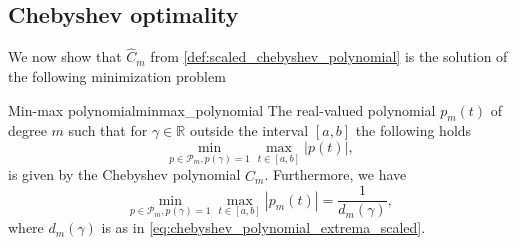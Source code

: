 \subsection{Chebyshev optimality}
We now show that $\hat{C}_m$ from \cref{def:scaled_chebyshev_polynomial} is the solution of the following minimization problem
\begin{APPfancyth}{Min-max polynomial}{minmax_polynomial}
  The real-valued polynomial $p_m(t)$ of degree $m$ such that for $\gamma\in\mathbb{R}$ outside the interval $[a, b]$ the following holds
  \[
    \min_{p\in\mathcal{P}_m,p(\gamma)=1} \max_{t\in[a,b]} |p(t)|,
  \]
  is given by the Chebyshev polynomial $\hat{C}_m$. Furthermore, we have
  \[
    \min_{p\in\mathcal{P}_m,p(\gamma)=1} \max_{t\in[a,b]} |p_m(t)| = \frac{1}{d_m(\gamma)},
  \]
  where $d_m(\gamma)$ is as in \cref{eq:chebyshev_polynomial_extrema_scaled}.
\end{APPfancyth}
